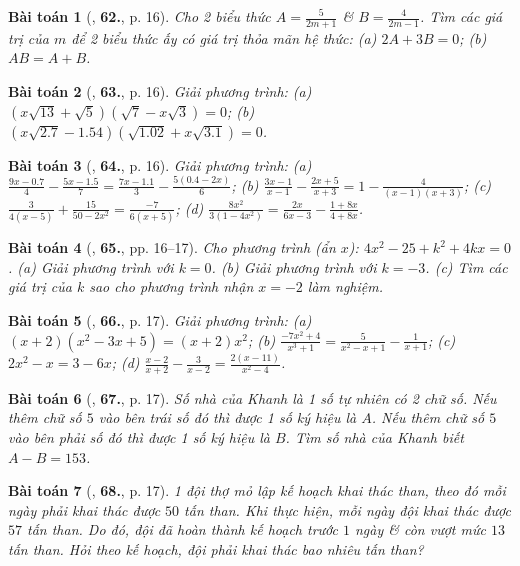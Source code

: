 \documentclass{article}
\numberwithin{equation}{section}
\newtheorem{baitoan}{Bài toán}
\begin{document}
\begin{baitoan}[\cite{SBT_Toan_8_tap_2}, \textbf{62.}, p. 16]
	Cho 2 biểu thức $A = \frac{5}{2m + 1}$ \& $B = \frac{4}{2m - 1}$. Tìm các giá trị của $m$ để 2 biểu thức ấy có giá trị thỏa mãn hệ thức: (a) $2A + 3B = 0$; (b) $AB = A + B$.
\end{baitoan}

\begin{baitoan}[\cite{SBT_Toan_8_tap_2}, \textbf{63.}, p. 16]
	Giải phương trình: (a) $(x\sqrt{13} + \sqrt{5})(\sqrt{7} - x\sqrt{3}) = 0$; (b) $(x\sqrt{2.7} - 1.54)(\sqrt{1.02} + x\sqrt{3.1}) = 0$.
\end{baitoan}

\begin{baitoan}[\cite{SBT_Toan_8_tap_2}, \textbf{64.}, p. 16]
	Giải phương trình: (a) $\frac{9x - 0.7}{4} - \frac{5x - 1.5}{7} = \frac{7x - 1.1}{3} - \frac{5(0.4 - 2x)}{6}$; (b) $\frac{3x - 1}{x - 1} - \frac{2x + 5}{x + 3} = 1 - \frac{4}{(x - 1)(x + 3)}$; (c) $\frac{3}{4(x - 5)} + \frac{15}{50 - 2x^2} = \frac{-7}{6(x + 5)}$; (d) $\frac{8x^2}{3(1 - 4x^2)} = \frac{2x}{6x - 3} - \frac{1 + 8x}{4 + 8x}$.
\end{baitoan}

\begin{baitoan}[\cite{SBT_Toan_8_tap_2}, \textbf{65.}, pp. 16--17]
	Cho phương trình (ẩn $x$): $4x^2 - 25 + k^2 + 4kx = 0$. (a) Giải phương trình với $k = 0$. (b) Giải phương trình với $k = -3$. (c) Tìm các giá trị của $k$ sao cho phương trình nhận $x = -2$ làm nghiệm.
\end{baitoan}

\begin{baitoan}[\cite{SBT_Toan_8_tap_2}, \textbf{66.}, p. 17]
	Giải phương trình: (a) $(x + 2)(x^2 - 3x + 5) = (x + 2)x^2$; (b) $\frac{-7x^2 + 4}{x^3 + 1} = \frac{5}{x^2 - x + 1} - \frac{1}{x + 1}$; (c) $2x^2 - x = 3 - 6x$; (d) $\frac{x - 2}{x + 2} - \frac{3}{x - 2} = \frac{2(x - 11)}{x^2 - 4}$.
\end{baitoan}

\begin{baitoan}[\cite{SBT_Toan_8_tap_2}, \textbf{67.}, p. 17]
	Số nhà của Khanh là 1 số tự nhiên có 2 chữ số. Nếu thêm chữ số $5$ vào bên trái số đó thì được 1 số ký hiệu là $A$. Nếu thêm chữ số $5$ vào bên phải số đó thì được 1 số ký hiệu là $B$. Tìm số nhà của Khanh biết $A - B = 153$.
\end{baitoan}

\begin{baitoan}[\cite{SBT_Toan_8_tap_2}, \textbf{68.}, p. 17]
	1 đội thợ mỏ lập kế hoạch khai thác than, theo đó mỗi ngày phải khai thác được $50$ tấn than. Khi thực hiện, mỗi ngày đội khai thác được $57$ tấn than. Do đó, đội đã hoàn thành kế hoạch trước $1$ ngày \& còn vượt mức $13$ tấn than. Hỏi theo kế hoạch, đội phải khai thác bao nhiêu tấn than?
\end{baitoan}
\end{document}
